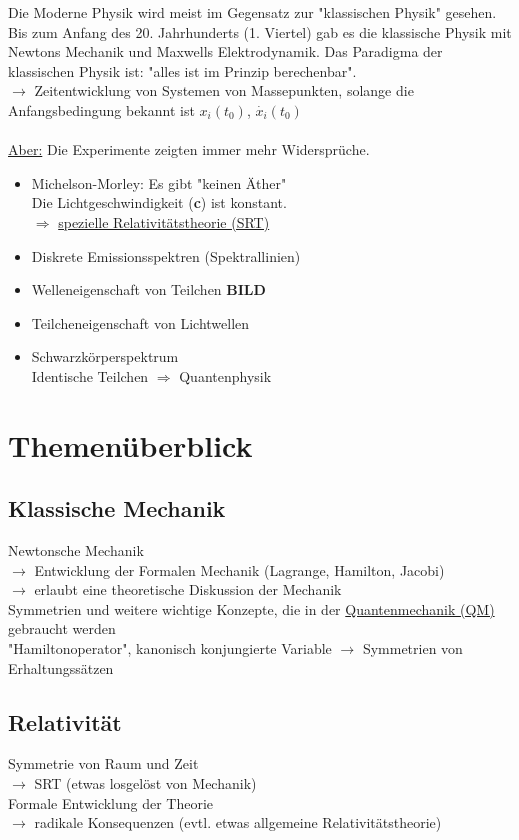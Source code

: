 Die Moderne Physik wird meist im Gegensatz zur "klassischen Physik" gesehen.\\
Bis zum Anfang des 20. Jahrhunderts (1. Viertel) gab es die klassische Physik mit Newtons Mechanik und Maxwells Elektrodynamik. Das Paradigma der klassischen Physik ist: "alles ist im Prinzip berechenbar".\\
$\rightarrow$ Zeitentwicklung von Systemen von Massepunkten, solange die Anfangsbedingung bekannt ist
$x_{i}(t_{0})$, $\dot{x_{i}}(t_{0})$\\
\\
\underline{Aber:} Die Experimente zeigten immer mehr Widerspr\"uche.
\begin{itemize}
  \item Michelson-Morley: Es gibt "keinen \"Ather"\\
        Die Lichtgeschwindigkeit (\textbf{c}) ist konstant.\\
        $\Rightarrow$ \underline{spezielle Relativit\"atstheorie (SRT)}
  \item Diskrete Emissionsspektren (Spektrallinien)
  \item Welleneigenschaft von Teilchen \textbf{BILD}
  \item Teilcheneigenschaft von Lichtwellen
  \item Schwarzk\"orperspektrum\\
        Identische Teilchen
        $\Rightarrow$ Quantenphysik
\end{itemize}

\section{Themen\"uberblick}
\subsection{Klassische Mechanik}
Newtonsche Mechanik\\
$\rightarrow$ Entwicklung der Formalen Mechanik (Lagrange, Hamilton, Jacobi)\\
$\rightarrow$ erlaubt eine theoretische Diskussion der Mechanik\\
Symmetrien und weitere wichtige Konzepte, die in der \underline{Quantenmechanik (QM)} gebraucht werden\\
"Hamiltonoperator", kanonisch konjungierte Variable $\rightarrow$ Symmetrien von Erhaltungss\"atzen

\subsection{Relativit\"at}
Symmetrie von Raum und Zeit\\
$\rightarrow$ SRT (etwas losgel\"ost von Mechanik)\\
Formale Entwicklung der Theorie\\
$\rightarrow$ radikale Konsequenzen
(evtl. etwas allgemeine Relativit\"atstheorie)

